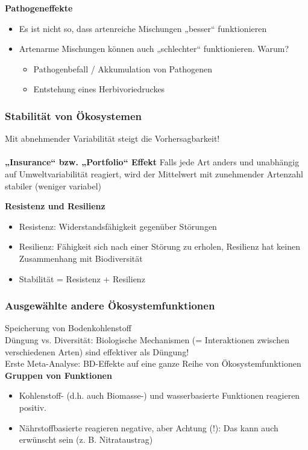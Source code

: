 \textbf{Pathogeneffekte}
\begin{itemize}
	\item Es ist nicht so, dass artenreiche Mischungen „besser“ funktionieren
	\item Artenarme Mischungen können auch „schlechter“ funktionieren. Warum?
	\begin{itemize}
		\item Pathogenbefall / Akkumulation von Pathogenen
		\item Entstehung eines Herbivoriedruckes
	\end{itemize}
\end{itemize}

\subsubsection{Stabilität von Ökosystemen}
Mit abnehmender Variabilität steigt die Vorhersagbarkeit!
\\\\
\textbf{„Insurance“ bzw. „Portfolio“ Effekt}
Falls jede Art anders und unabhängig auf Umweltvariabilität reagiert, wird der Mittelwert mit zunehmender Artenzahl stabiler (weniger variabel)

\textbf{Resistenz und Resilienz}
\begin{itemize}
	\item Resistenz: Widerstandsfähigkeit gegenüber Störungen
	\item Resilienz: Fähigkeit sich nach einer Störung zu erholen, Resilienz hat keinen Zusammenhang mit Biodiversität
	\item Stabilität = Resistenz + Resilienz
\end{itemize}

\subsubsection{Ausgewählte andere Ökosystemfunktionen}
Speicherung von Bodenkohlenstoff\\
Düngung vs. Diversität: Biologische Mechanismen (= Interaktionen zwischen verschiedenen Arten) sind effektiver als Düngung!\\

Erste Meta-Analyse: BD-Effekte auf eine ganze Reihe von Ökosystemfunktionen
\\
\textbf{Gruppen von Funktionen}\\
\begin{itemize}
	\item Kohlenstoff- (d.h. auch Biomasse-) und wasserbasierte Funktionen reagieren positiv.
	\item Nährstoffbasierte reagieren negative, aber Achtung (!): Das kann auch erwünscht sein (z. B. Nitrataustrag)
\end{itemize}

